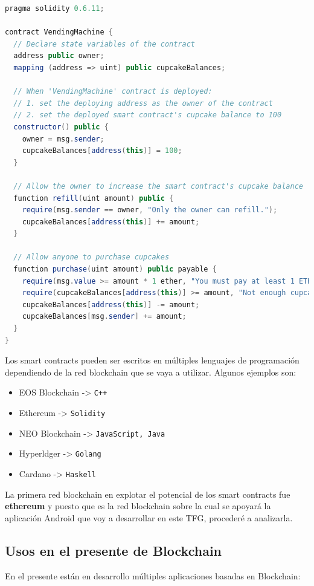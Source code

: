 \begin{lstlisting}[language=Java,float=ht,caption={[Smart Contract]Ejemplo de código fuente de un smart contract escrito en Solidity},label=lst:java]
pragma solidity 0.6.11;

contract VendingMachine {
  // Declare state variables of the contract
  address public owner;
  mapping (address => uint) public cupcakeBalances;

  // When 'VendingMachine' contract is deployed:
  // 1. set the deploying address as the owner of the contract
  // 2. set the deployed smart contract's cupcake balance to 100
  constructor() public {
    owner = msg.sender;
    cupcakeBalances[address(this)] = 100;
  }

  // Allow the owner to increase the smart contract's cupcake balance
  function refill(uint amount) public {
    require(msg.sender == owner, "Only the owner can refill.");
    cupcakeBalances[address(this)] += amount;
  }

  // Allow anyone to purchase cupcakes
  function purchase(uint amount) public payable {
    require(msg.value >= amount * 1 ether, "You must pay at least 1 ETH per cupcake");
    require(cupcakeBalances[address(this)] >= amount, "Not enough cupcakes in stock to complete this purchase");
    cupcakeBalances[address(this)] -= amount;
    cupcakeBalances[msg.sender] += amount;
  }
}
\end{lstlisting}

Los smart contracts pueden ser escritos en múltiples lenguajes de programación dependiendo de la red blockchain que se vaya a utilizar. Algunos ejemplos son:
\begin{itemize}
\item EOS Blockchain -> \verb|C++|
\item Ethereum -> \verb|Solidity|
\item NEO Blockchain -> \verb|JavaScript, Java|
\item Hyperldger -> \verb|Golang|
\item Cardano -> \verb|Haskell|
\end{itemize}

La primera red blockchain en explotar el potencial de los smart contracts fue \textbf{ethereum} y puesto que es la red blockchain sobre la cual se apoyará la aplicación Android que voy a desarrollar en este TFG, procederé a analizarla.

\subsection{Usos en el presente de Blockchain}
En el presente están en desarrollo múltiples aplicaciones basadas en Blockchain:

